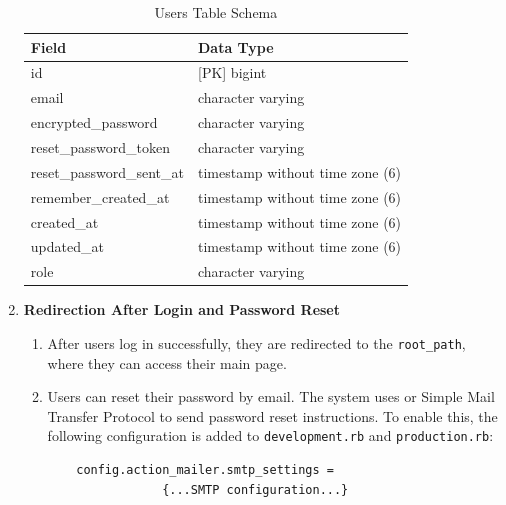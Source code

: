 \begin{enumerate}
\begin{table}[h!]
\captionsetup{justification=centering, singlelinecheck=false, labelsep=space}
\centering
\begin{tabular}{ll} %
\hline
\textbf{Field}               & \textbf{Data Type}                 \\ \hline
id                           & [PK] bigint                        \\ 
email                        & character varying                  \\ 
encrypted\_password          & character varying                  \\ 
reset\_password\_token       & character varying                  \\ 
reset\_password\_sent\_at    & timestamp without time zone (6)    \\ 
remember\_created\_at        & timestamp without time zone (6)    \\ 
created\_at                  & timestamp without time zone (6)    \\ 
updated\_at                  & timestamp without time zone (6)    \\ 
role                         & character varying                  \\ \hline
\end{tabular}
\caption{Users Table Schema} %
\label{tab:user_schema} %
\end{table}


    \newpage
    \item \textbf{Redirection After Login and Password Reset}

    \begin{enumerate}
        \item After users log in successfully, they are redirected to the \texttt{root\_path}, where they can access their main page.

        \item Users can reset their password by email. The system uses \citeauthor{smtp2024} or Simple Mail Transfer Protocol to send password reset instructions. To enable this, the following configuration is added to \texttt{development.rb} and \texttt{production.rb}:

\begin{lstlisting}
    config.action_mailer.smtp_settings = 
                {...SMTP configuration...}
\end{lstlisting}


\end{enumerate}
\end{enumerate}
